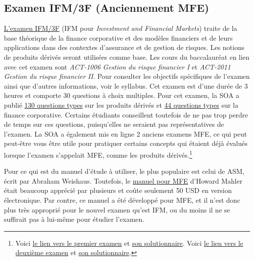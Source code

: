 \newpage
\subsection*{Examen IFM/3F (Anciennement MFE)}
\label{subsec:exammfe}
\href{https://www.soa.org/Education/Exam-Req/edu-exam-ifm-detail.aspx}{L'examen IFM/3F} (IFM pour \textit{Investment and Financial Markets}) traite de la base théorique de la finance corporative et des modèles financiers et de leurs applications dans des contextes d'assurance et de gestion de risques. Les notions de produits dérivés seront utilisées comme base. Les cours du baccalauréat en lien avec cet examen sont \textit{ACT-1006 Gestion du risque financier I} et \textit{ACT-2011 Gestion du risque financier II}. Pour consulter les objectifs spécifiques de l'examen ainsi que d'autres informations, voir le syllabus. Cet examen est d'une durée de 3 heures et comporte 30 questions à choix multiples. Pour cet examen, la SOA a publié \href{https://www.soa.org/Files/Edu/2018/ifm-derivatives-questions-solutions.pdf}{130 questions types} sur les produits dérivés et \href{https://www.soa.org/Files/Edu/2018/2018-exam-ifm-sample-questions.pdf}{44 questions types} sur la finance corporative. Certains étudiants conseillent toutefois de ne pas trop perdre de temps sur ces questions, puisqu'elles ne seraient pas représentatives de l'examen. La SOA a également mis en ligne 2 anciens examens MFE, ce qui peut peut-être vous être utile pour pratiquer certains concepts qui étaient déjà évalués lorsque l'examen s'appelait MFE, comme les produits dérivés.\footnote{Voici \href{https://www.soa.org/files/edu/edu-2009-05-mfe-exam.pdf}{le lien vers le premier examen} et \href{https://www.soa.org/files/edu/edu-2009-05-mfe-exam-sol.pdf}{son solutionnaire}. Voici \href{https://www.soa.org/files/edu/edu-mc-exam-mfe-0507.pdf}{le lien vers le deuxième examen} et \href{https://www.soa.org/files/edu/edu-exam-mfe-0507-sol.pdf}{son solutionnaire}.}\vspace{\baselineskip}

Pour ce qui est du manuel d'étude à utiliser, le plus populaire est celui de ASM, écrit par Abraham Weishaus. Toutefois, le \href{http://howardmahler.com/Teaching/MFE.html}{manuel pour MFE} d'Howard Mahler était beaucoup apprécié par plusieurs et coûte seulement 50 USD en version électronique. Par contre, ce manuel a été développé pour MFE, et il n'est donc plus très approprié pour le nouvel examen qu'est IFM, ou du moins il ne se suffirait pas à lui-même pour étudier l'examen. \vspace{\baselineskip}

